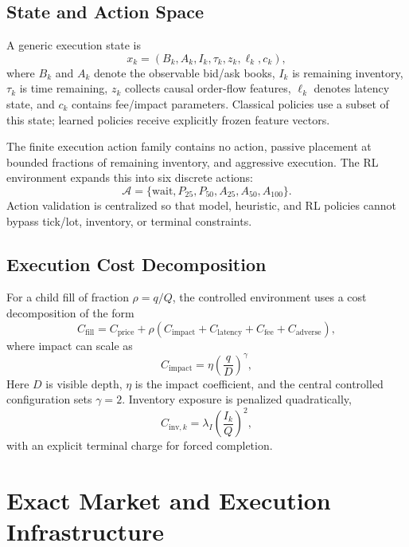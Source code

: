 \documentclass[journal,10pt]{IEEEtran}
\newcommand{\1}{\mathbf{1}}
\begin{document}
\subsection{State and Action Space}
A generic execution state is
\begin{equation}
x_k=(B_k, A_k, I_k, \tau_k, z_k, \ell_k, c_k),
\end{equation}
where $B_k$ and $A_k$ denote the observable bid/ask books, $I_k$ is remaining inventory, $\tau_k$ is time remaining, $z_k$ collects causal order-flow features, $\ell_k$ denotes latency state, and $c_k$ contains fee/impact parameters. Classical policies use a subset of this state; learned policies receive explicitly frozen feature vectors.

The finite execution action family contains no action, passive placement at bounded fractions of remaining inventory, and aggressive execution. The RL environment expands this into six discrete actions:
\begin{equation}
\mathcal{A}=\{\text{wait},P_{25},P_{50},A_{25},A_{50},A_{100}\}.
\label{eq:rl-actions}
\end{equation}
Action validation is centralized so that model, heuristic, and RL policies cannot bypass tick/lot, inventory, or terminal constraints.

\subsection{Execution Cost Decomposition}
For a child fill of fraction $\rho=q/Q$, the controlled environment uses a cost decomposition of the form
\begin{equation}
C_{\mathrm{fill}} = C_{\mathrm{price}} + \rho\left(C_{\mathrm{impact}} + C_{\mathrm{latency}} + C_{\mathrm{fee}} + C_{\mathrm{adverse}}\right),
\label{eq:fill-cost}
\end{equation}
where impact can scale as
\begin{equation}
C_{\mathrm{impact}} = \eta\left(\frac{q}{D}\right)^\gamma,
\end{equation}
Here $D$ is visible depth, $\eta$ is the impact coefficient, and the central controlled configuration sets $\gamma=2$. Inventory exposure is penalized quadratically,
\begin{equation}
C_{\mathrm{inv},k}=\lambda_I\left(\frac{I_k}{Q}\right)^2,
\label{eq:inventory-risk}
\end{equation}
with an explicit terminal charge for forced completion.

\section{Exact Market and Execution Infrastructure}
\label{sec:infrastructure}
\end{document}
